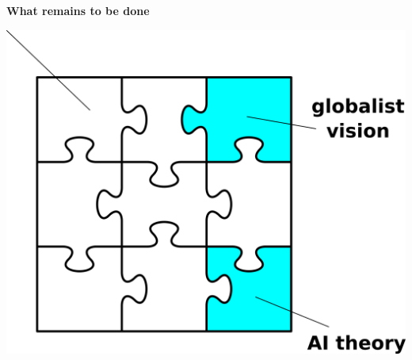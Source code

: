 \documentclass[10pt]{beamer}
\begin{document}
\begin{frame}
\vspace*{2em}
{\color{blue} \Large \textbf{What remains to be done}}

\vspace{0.5em}
\hspace*{5em}\includegraphics[scale=0.4]{jigsaw-puzzle.png}
\end{frame}
\end{document}
